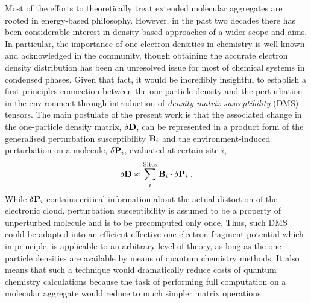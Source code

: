 \documentclass[aip,amsmath,amssymb,reprint,floatfix]{revtex4-1}
\begin{document}
Most of the efforts to theoretically treat extended molecular aggregates are rooted in energy\hyp{}based 
philosophy. However, in the past two decades there has been considerable interest in density\hyp{}based approaches
of a wider scope and aims.\cite{Yang.Lee.JCP.1995,
Mukamel.Berman.JCP.2003,
Piquemal.Cisneros.Reinhardt.Gresh.Darden.JCP.2006,
Elliott.Burke.Cohen.Wasserman.PhysRevA.2010,
Mandado.Hermida-Ramon.JCTC.2011,Sun.Chan.ACR.2016,Hedegard.Reiher.JCTC.2016} 
In particular, the importance of one\hyp{}electron densities in chemistry is well known and acknowledged 
in the community,\cite{Holas.March.PhysRevA.1991,Yang.PhysRevLett.1991,Yang.Lee.JCP.1995} 
though obtaining the accurate electron density distribution 
has been an unresolved issue for most of chemical systems in condensed phases. Given that fact, it would be 
incredibly insightful to establish a first\hyp{}principles connection between the one\hyp{}particle density 
and the perturbation in the environment through introduction of \emph{density matrix susceptibility} (DMS) tensors. 
The main postulate of the present work is that the associated change in the one\hyp{}particle density matrix, 
$\delta {\bf D}$, can be represented in a product form of the generalised perturbation susceptibility ${\bf B}_i$
and the environment\hyp{}induced perturbation on a molecule, $\delta {\bf P}_i$, evaluated at certain site $i$,
%
\begin{equation*} \label{e:initial-model}
  \delta {\bf D} \approx \sum_i^{\text{Sites}} {\bf B}_i
  \cdot  \delta {\bf P}_i \;.
\end{equation*}
%
While $\delta {\bf P}_i$ contains critical information about the actual distortion of the electronic cloud,
perturbation susceptibility is assumed to be a property of unperturbed molecule and is to be precomputed only once. 
Thus, such DMS could be adapted into an efficient effective one\hyp{}electron fragment potential which in principle, 
is applicable to an arbitrary level of theory, as long as the one\hyp{}particle densities are available by means of
quantum chemistry methods. It also means that such a technique would dramatically reduce costs of quantum chemistry 
calculations because the task of performing full computation on a molecular aggregate would reduce to much simpler
matrix operations.
\end{document}
